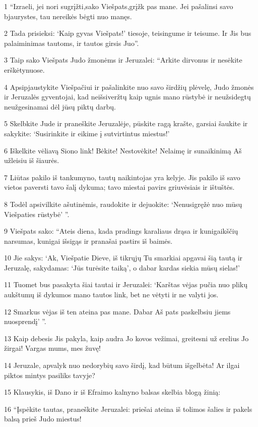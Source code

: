 \par 1 “Izraeli, jei nori sugrįžti,­sako Viešpats,­grįžk pas mane. Jei pašalinsi savo bjaurystes, tau nereikės bėgti nuo manęs. 
\par 2 Tada prisieksi: ‘Kaip gyvas Viešpats!’ tiesoje, teisingume ir teisume. Ir Jis bus palaiminimas tautoms, ir tautos girsis Juo”. 
\par 3 Taip sako Viešpats Judo žmonėms ir Jeruzalei: “Arkite dirvonus ir nesėkite erškėtynuose. 
\par 4 Apsipjaustykite Viešpačiui ir pašalinkite nuo savo širdžių plėvelę, Judo žmonės ir Jeruzalės gyventojai, kad neišsiveržtų kaip ugnis mano rūstybė ir neužsidegtų neužgesinamai dėl jūsų piktų darbų. 
\par 5 Skelbkite Jude ir praneškite Jeruzalėje, pūskite ragą krašte, garsiai šaukite ir sakykite: ‘Susirinkite ir eikime į sutvirtintus miestus!’ 
\par 6 Iškelkite vėliavą Siono link! Bėkite! Nestovėkite! Nelaimę ir sunaikinimą Aš užleisiu iš šiaurės. 
\par 7 Liūtas pakilo iš tankumyno, tautų naikintojas yra kelyje. Jis pakilo iš savo vietos paversti tavo šalį dykuma; tavo miestai pavirs griuvėsiais ir ištuštės. 
\par 8 Todėl apsivilkite ašutinėmis, raudokite ir dejuokite: ‘Nenusigręžė nuo mūsų Viešpaties rūstybė’ ”. 
\par 9 Viešpats sako: “Ateis diena, kada pradings karaliaus drąsa ir kunigaikščių narsumas, kunigai išsigąs ir pranašai pastirs iš baimės. 
\par 10 Jie sakys: ‘Ak, Viešpatie Dieve, iš tikrųjų Tu smarkiai apgavai šią tautą ir Jeruzalę, sakydamas: ‘Jūs turėsite taiką’, o dabar kardas siekia mūsų sielas!’ 
\par 11 Tuomet bus pasakyta šiai tautai ir Jeruzalei: ‘Karštas vėjas pučia nuo plikų aukštumų iš dykumos mano tautos link, bet ne vėtyti ir ne valyti jos. 
\par 12 Smarkus vėjas iš ten ateina pas mane. Dabar Aš pats paskelbsiu jiems nuosprendį’ ”. 
\par 13 Kaip debesis Jis pakyla, kaip audra Jo kovos vežimai, greitesni už erelius Jo žirgai! Vargas mums, mes žuvę! 
\par 14 Jeruzale, apvalyk nuo nedorybių savo širdį, kad būtum išgelbėta! Ar ilgai piktos mintys pasiliks tavyje? 
\par 15 Klausykis, iš Dano ir iš Efraimo kalnyno balsas skelbia blogą žinią: 
\par 16 “Įspėkite tautas, praneškite Jeruzalei: priešai ateina iš tolimos šalies ir pakels balsą prieš Judo miestus! 
